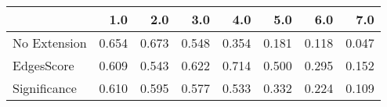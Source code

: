 \begin{tabular}{lrrrrrrr}
\toprule
{} &   1.0 &   2.0 &   3.0 &   4.0 &   5.0 &   6.0 &   7.0 \\
\midrule
No Extension & 0.654 & 0.673 & 0.548 & 0.354 & 0.181 & 0.118 & 0.047 \\
EdgesScore   & 0.609 & 0.543 & 0.622 & 0.714 & 0.500 & 0.295 & 0.152 \\
Significance & 0.610 & 0.595 & 0.577 & 0.533 & 0.332 & 0.224 & 0.109 \\
\bottomrule
\end{tabular}
